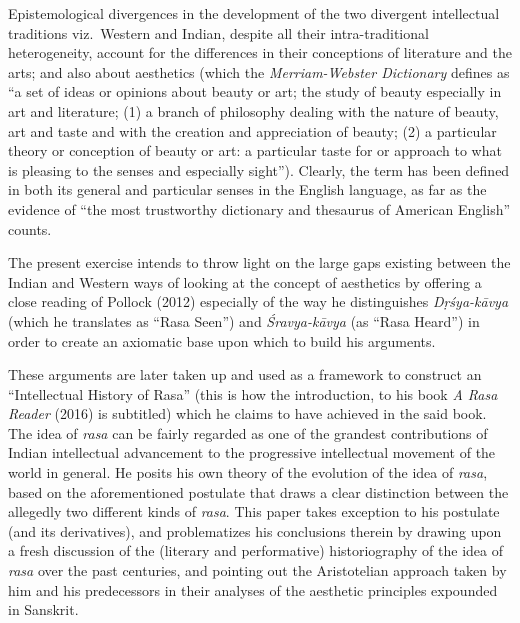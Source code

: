 Epistemological divergences in the development of the two divergent intellectual traditions viz.~Western and Indian, despite all their intra-traditional heterogeneity, account for the differences in their conceptions of literature and the arts; and also about aesthetics (which the \textsl{Merriam-Webster Dictionary} defines as “a set of ideas or opinions about beauty or art; the study of beauty especially in art and literature; (1) a branch of philosophy dealing with the nature of beauty, art and taste and with the creation and appreciation of beauty; (2) a particular theory or conception of beauty or art: a particular taste for or approach to what is pleasing to the senses and especially sight”). Clearly, the term has been defined in both its general and particular senses in the English language, as far as the evidence of “the most trustworthy dictionary and thesaurus of American English” counts. 

The present exercise intends to throw light on the large gaps existing between the Indian and Western ways of looking at the concept of aesthetics by offering a close reading of Pollock (2012) especially of the way he distinguishes \textsl{Dṛśya-kāvya} (which he translates as “Rasa Seen”) and \textsl{Śravya-kāvya} (as “Rasa Heard”) in order to create an axiomatic base upon which to build his arguments. 

These arguments are later taken up and used as a framework to construct an “Intellectual History of Rasa” (this is how the introduction, to his book \textsl{A Rasa Reader} (2016) is subtitled) which he claims to have achieved in the said book. The idea of \textsl{rasa} can be fairly regarded as one of the grandest contributions of Indian intellectual advancement to the progressive intellectual movement of the world in general. He posits his own theory of the evolution of the idea of \textsl{rasa}, based on the aforementioned postulate that draws a clear distinction between the allegedly two different kinds of \textsl{rasa}. This paper takes exception to his postulate (and its derivatives), and problematizes his conclusions therein by drawing upon a fresh discussion of the (literary and performative) historiography of the idea of \textsl{rasa} over the past centuries, and pointing out the Aristotelian approach taken by him and his predecessors in their analyses of the aesthetic principles expounded in Sanskrit.

